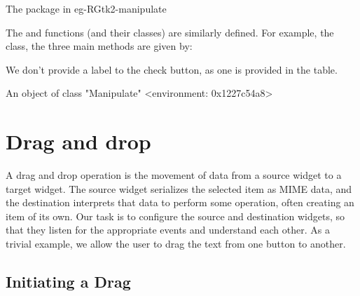 \begin{example}{The  package in }{eg-RGtk2-manipulate}
%

The  and  functions (and their
classes) are similarly defined. For example, the 
class, the three main methods are given by:
\begin{Schunk}
\end{Schunk}
%
We don't provide a label to the check button, as one is provided in
the table.


\begin{Schunk}
\begin{Soutput}
An object of class "Manipulate"
<environment: 0x1227c54a8>
\end{Soutput}
\end{Schunk}
\end{example}

\section{Drag and drop}
\label{sec:RGtk2:dnd}


A drag and drop operation is the movement of data from a source widget
to a target widget. The source widget serializes the selected item as
MIME data, and the destination interprets that data to perform some
operation, often creating an item of its own. Our task is to configure
the source and destination widgets, so that they listen for the
appropriate events and understand each other. As a trivial example, we
allow the user to drag the text from one button to another.

\subsection{Initiating a Drag}

